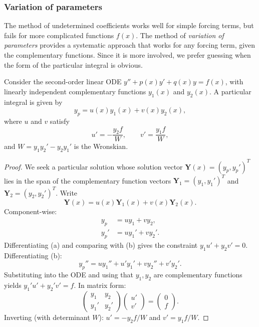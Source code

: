 \documentclass[a4paper]{article}
\begin{document}
\subsubsection{Variation of parameters}
\begin{remark}[Motivation]
  The method of undetermined coefficients works well for simple forcing terms, but fails for more complicated functions $f(x)$. The method of \emph{variation of parameters} provides a systematic approach that works for any forcing term, given the complementary functions. Since it is more involved, we prefer guessing when the form of the particular integral is obvious.
\end{remark}

\begin{thm}
  Consider the second-order linear ODE $y'' + p(x)y' + q(x)y = f(x)$, with linearly independent complementary functions $y_1(x)$ and $y_2(x)$. A particular integral is given by
  \[
    y_p = u(x)y_1(x) + v(x)y_2(x),
  \]
  where $u$ and $v$ satisfy
  \[
    u' = -\frac{y_2 f}{W}, \qquad v' = \frac{y_1 f}{W},
  \]
  and $W = y_1 y_2' - y_2 y_1'$ is the Wronskian.
\end{thm}
\begin{proof}
  We seek a particular solution whose solution vector $\mathbf{Y}(x) = (y_p, y_p')^T$ lies in the span of the complementary function vectors $\mathbf{Y}_1 = (y_1, y_1')^T$ and $\mathbf{Y}_2 = (y_2, y_2')^T$. Write
  \[
    \mathbf{Y}(x) = u(x)\mathbf{Y}_1(x) + v(x)\mathbf{Y}_2(x).
  \]
  Component-wise:
  \begin{align*}
    y_p &= uy_1 + vy_2, \tag{a}\\
    y_p' &= uy_1' + vy_2'. \tag{b}
  \end{align*}
  Differentiating (a) and comparing with (b) gives the constraint $y_1 u' + y_2 v' = 0$. Differentiating (b):
  \[
    y_p'' = uy_1'' + u'y_1' + vy_2'' + v'y_2'.
  \]
  Substituting into the ODE and using that $y_1, y_2$ are complementary functions yields $y_1'u' + y_2'v' = f$. In matrix form:
  \[
    \begin{pmatrix} y_1 & y_2 \\ y_1' & y_2' \end{pmatrix}
    \begin{pmatrix} u' \\ v' \end{pmatrix}
    = \begin{pmatrix} 0 \\ f \end{pmatrix}.
  \]
  Inverting (with determinant $W$): $u' = -y_2 f/W$ and $v' = y_1 f/W$.
\end{proof}
\end{document}
